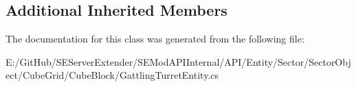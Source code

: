 \subsection*{Additional Inherited Members}


The documentation for this class was generated from the following file\+:\begin{DoxyCompactItemize}
\item 
E\+:/\+Git\+Hub/\+S\+E\+Server\+Extender/\+S\+E\+Mod\+A\+P\+I\+Internal/\+A\+P\+I/\+Entity/\+Sector/\+Sector\+Object/\+Cube\+Grid/\+Cube\+Block/Gattling\+Turret\+Entity.\+cs\end{DoxyCompactItemize}
